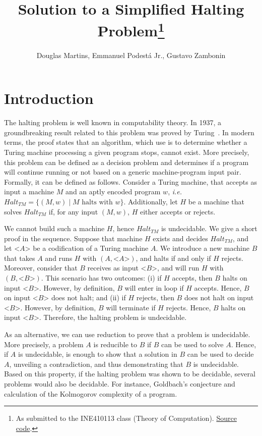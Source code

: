 \documentclass[12pt]{article}
\title{Solution to a Simplified Halting Problem\footnote{
    As submitted to the INE410113 class (Theory of Computation).
    \href{https://github.com/zambonin/ine410113}{Source code}.}}
\author{Douglas Martins\inst{1}, Emmanuel Podestá Jr.\inst{1}, Gustavo
    Zambonin\inst{1}}
\begin{document}
\maketitle

\section{Introduction}\label{sec:intro}

The halting problem is well known in computability theory. In 1937, a
groundbreaking result related to this problem was proved by
Turing~\cite{Turing:article:1937:jan}. In modern terms, the proof states that
an algorithm, which use is to determine whether a Turing machine processing a
given program stops, cannot exist. More precisely, this problem can be defined
as a decision problem and determines if a program will continue running or not
based on a generic machine-program input pair. Formally, it can be defined as
follows. Consider a Turing machine, that accepts as input a machine $M$ and an
aptly encoded program $w$, \emph{i.e.} $Halt_{TM} = \{(M, w) \mid M
\text{ halts with } w\}$. Additionally, let $H$ be a machine that solves
$Halt_{TM}$ if, for any input $(M, w)$, $H$ either accepts or rejects.

We cannot build such a machine $H$, hence $Halt_{TM}$ is undecidable. We give a
short proof in the sequence. Suppose that machine $H$ exists and decides
$Halt_{TM}$, and let <$A$> be a codification of a Turing machine $A$. We
introduce a new machine $B$ that takes $A$ and runs $H$ with $(A,
\text{<}A\text{>})$, and halts if and only if $H$ rejects. Moreover, consider
that $B$ receives as input <$B$>, and will run $H$ with $(B,
\text{<}B\text{>})$. This scenario has two outcomes: (i) if $H$ accepts, then
$B$ halts on input <$B$>. However, by definition, $B$ will enter in loop if $H$
accepts. Hence, $B$ on input <$B$> does not halt; and (ii) if $H$ rejects, then
$B$ does not halt on input <$B$>. However, by definition, $B$ will terminate if
$H$ rejects. Hence, $B$ halts on input <$B$>. Therefore, the halting problem is
undecidable.

As an alternative, we can use reduction to prove that a problem is undecidable.
More precisely, a problem $A$ is reducible to $B$ if $B$ can be used to solve
$A$. Hence, if $A$ is undecidable, is enough to show that a solution in $B$ can
be used to decide $A$, unveiling a contradiction, and thus demonstrating that
$B$ is undecidable. Based on this property, if the halting problem was shown to
be decidable, several problems would also be decidable. For instance,
Goldbach's conjecture and calculation of the Kolmogorov complexity of a
program.
\end{document}
